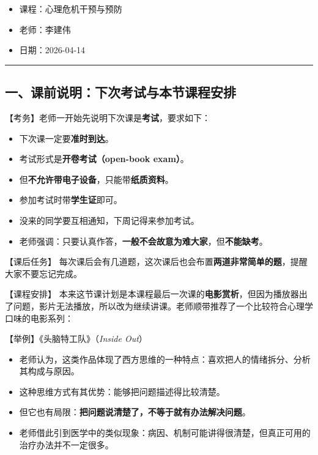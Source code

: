 \documentclass[
  chinese,
  9pt,
  a4paper,
]{ctexart}
\providecommand{\tightlist}{%
  \setlength{\itemsep}{0pt}\setlength{\parskip}{0pt}}
\begin{document}
\begin{itemize}
\tightlist
\item
  课程：心理危机干预与预防
\item
  老师：李建伟
\item
  日期：2026-04-14
\end{itemize}

\begin{center}\rule{0.5\linewidth}{0.5pt}\end{center}

\subsection{一、课前说明：下次考试与本节课程安排}\label{ux4e00ux8bfeux524dux8bf4ux660eux4e0bux6b21ux8003ux8bd5ux4e0eux672cux8282ux8bfeux7a0bux5b89ux6392}

【考务】老师一开始先说明下次课是\textbf{考试}，要求如下：

\begin{itemize}
\tightlist
\item
  下次课一定要\textbf{准时到达}。
\item
  考试形式是\textbf{开卷考试（open-book exam）}。
\item
  但\textbf{不允许带电子设备}，只能带\textbf{纸质资料}。
\item
  参加考试时带\textbf{学生证}即可。
\item
  没来的同学要互相通知，下周记得来参加考试。
\item
  老师强调：只要认真作答，\textbf{一般不会故意为难大家}，但\textbf{不能缺考}。
\end{itemize}

【课后任务】
每次课后会有几道题，这次课后也会布置\textbf{两道非常简单的题}，提醒大家不要忘记完成。

【课程安排】
本来这节课计划是本课程最后一次课的\textbf{电影赏析}，但因为播放器出了问题，影片无法播放，所以改为继续讲课。老师顺带推荐了一个比较符合心理学口味的电影系列：

【举例】《头脑特工队》（\emph{Inside Out}）

\begin{itemize}
\tightlist
\item
  老师认为，这类作品体现了西方思维的一种特点：喜欢把人的情绪拆分、分析其构成与原因。
\item
  这种思维方式有其优势：能够把问题描述得比较清楚。
\item
  但它也有局限：\textbf{把问题说清楚了，不等于就有办法解决问题}。
\item
  老师借此引到医学中的类似现象：病因、机制可能讲得很清楚，但真正可用的治疗办法并不一定很多。
\end{itemize}
\end{document}
